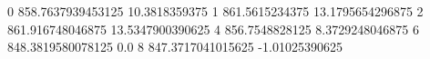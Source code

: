 0 858.7637939453125 10.3818359375
1 861.5615234375 13.1795654296875
2 861.916748046875 13.5347900390625
4 856.7548828125 8.3729248046875
6 848.3819580078125 0.0
8 847.3717041015625 -1.01025390625
